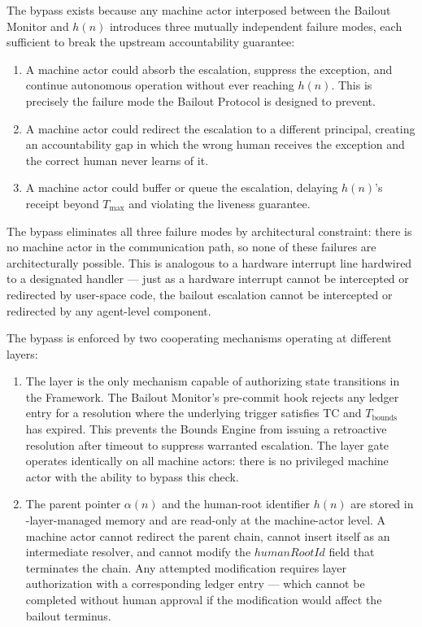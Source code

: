 The bypass exists because any machine actor interposed between the Bailout Monitor and $h(n)$ introduces three mutually independent failure modes, each sufficient to break the upstream accountability guarantee:

\begin{enumerate}
\item[\textbf{Intercept.}] A machine actor could absorb the escalation, suppress the exception, and continue autonomous operation without ever reaching $h(n)$. This is precisely the failure mode the Bailout Protocol is designed to prevent.

\item[\textbf{Redirect.}] A machine actor could redirect the escalation to a different principal, creating an accountability gap in which the wrong human receives the exception and the correct human never learns of it.

\item[\textbf{Delay.}] A machine actor could buffer or queue the escalation, delaying $h(n)$'s receipt beyond $T_{\max}$ and violating the liveness guarantee.
\end{enumerate}

The bypass eliminates all three failure modes by architectural constraint: there is no machine actor in the communication path, so none of these failures are architecturally possible. This is analogous to a hardware interrupt line hardwired to a designated handler — just as a hardware interrupt cannot be intercepted or redirected by user-space code, the bailout escalation cannot be intercepted or redirected by any agent-level component.

The bypass is enforced by two cooperating mechanisms operating at different layers:

\begin{enumerate}
\item[\textbf{\fact{} layer gate.}] The \fact{} layer is the only mechanism capable of authorizing state transitions in the \bxthree{} Framework. The Bailout Monitor's pre-commit hook rejects any ledger entry for a resolution where the underlying trigger satisfies TC and $T_{\text{bounds}}$ has expired. This prevents the Bounds Engine from issuing a retroactive resolution after timeout to suppress warranted escalation. The \fact{} layer gate operates identically on all machine actors: there is no privileged machine actor with the ability to bypass this check.

\item[\textbf{Immutable parent-pointer and human-root architecture.}] The parent pointer $\alpha(n)$ and the human-root identifier $h(n)$ are stored in \fact-layer-managed memory and are read-only at the machine-actor level. A machine actor cannot redirect the parent chain, cannot insert itself as an intermediate resolver, and cannot modify the $humanRootId$ field that terminates the chain. Any attempted modification requires \purpose{} layer authorization with a corresponding ledger entry — which cannot be completed without human approval if the modification would affect the bailout terminus.
\end{enumerate}

